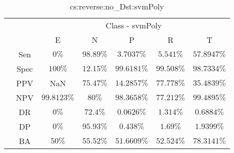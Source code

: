 \begin{table}[!ht]
	\centering
	\begin{tabular}{|c|c|c|c|c|c|c|}
		\cline{3-7}
		\multicolumn{2}{c|}{} & \multicolumn{5}{c|}{Class - svmPoly} \\ \cline{3-7}
		\multicolumn{2}{c|}{} & E & N & P & R & T \\ \hline
		\multirow{7}{*}{\rotatebox{90}{Statistics}} & Sen & $0\%$ & $98.89\%$ & $3.7037\%$ & $5.541\%$ & $57.8947\%$ \\ \cline{2-7}
		 & Spec & $100\%$ & $12.15\%$ & $99.6181\%$ & $99.508\%$ & $98.7334\%$ \\ \cline{2-7}
		 & PPV & NaN & $75.47\%$ & $14.2857\%$ & $77.778\%$ & $35.4839\%$ \\ \cline{2-7}
		 & NPV & $99.8123\%$ & $80\%$ & $98.3658\%$ & $77.212\%$ & $99.4895\%$ \\ \cline{2-7}
		 & DR & $0\%$ & $72.4\%$ & $0.0626\%$ & $1.314\%$ & $0.6884\%$ \\ \cline{2-7}
		 & DP & $0\%$ & $95.93\%$ & $0.438\%$ & $1.69\%$ & $1.9399\%$ \\ \cline{2-7}
		 & BA & $50\%$ & $55.52\%$ & $51.6609\%$ & $52.524\%$ & $78.3141\%$ \\ \hline
	\end{tabular}
	\caption{cs:reverse:no_Dst:svmPoly}
	\label{tab:cs:reverse:no_Dst:svmPoly}
\end{table}

